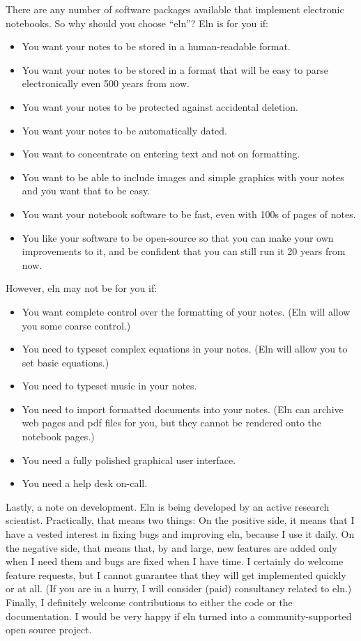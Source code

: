 \documentclass[11pt]{report}
\begin{document}
There are any
number of software packages available that implement electronic
notebooks. So why should you choose ``eln''? Eln is for you if:
\begin{itemize}
  \item You want your notes to be stored in a human-readable format.
  \item You want your notes to be stored in a format that will be easy to
    parse electronically even 500 years from now.
  \item You want your notes to be protected against accidental
    deletion.
  \item You want your notes to be automatically dated.
  \item You want to concentrate on entering text and not on
    formatting.
  \item You want to be able to include images and simple graphics with
    your notes and you want that to be easy.
  \item You want your notebook software to be fast, even with 100s
    of pages of notes.
  \item You like your software to be open-source so that you can make
    your own improvements to it, and be confident that you can still
    run it 20 years from now.
\end{itemize}\pagebreak

\noindent However, eln may not be for you if:
\begin{itemize}
  \item You want complete control over the formatting of your notes.
    (Eln will allow you some coarse control.)
  \item You need to typeset complex equations in your notes. (Eln
    will allow you to set basic equations.)
  \item You need to typeset music in your notes.
  \item You need to import formatted documents into your notes. (Eln
    can archive web pages and pdf files for you, but they cannot be
    rendered onto the notebook pages.)
  \item You need a fully polished graphical user interface.
  \item You need a help desk on-call.
\end{itemize}
\noindent Lastly, a note on development. Eln is being developed by an
active research scientist. Practically, that means two things: On the
positive side, it means that I have a vested interest in fixing bugs
and improving eln, because I use it daily. On the negative side, that
means that, by and large, new features are added only when I need them
and bugs are fixed when I have time. I certainly do welcome feature
requests, but I cannot guarantee that they will get implemented
quickly or at all. (If you are in a hurry, I will consider (paid)
consultancy related to eln.) Finally, I definitely welcome
contributions to either the code or the documentation. I would be very
happy if eln turned into a community-supported open source project.
\end{document}
